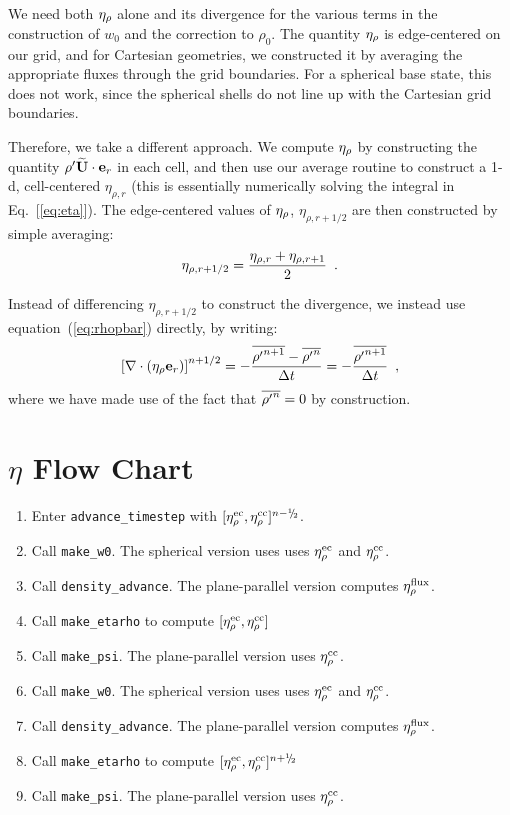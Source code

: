We need both $\eta_{\rho}$ alone and its divergence for the
various terms in the construction of $w_0$ and the correction to
$\rho_0$.  The quantity $\eta_{\rho}$ is edge-centered on our grid, and
for Cartesian geometries, we constructed it by averaging the
appropriate fluxes through the grid boundaries.  For a spherical base
state, this does not work, since the spherical shells do not line up
with the Cartesian grid boundaries.

Therefore, we take a different approach.  We compute $\eta_{\rho}$ by
constructing the quantity ${\rho^{\prime}} \widetilde{{\bf U}} \cdot \mathbf{e}_r$ in each cell, and then
use our average routine to construct a 1-d, cell-centered
$\eta_{\rho,r}$ (this is essentially numerically solving the integral
in Eq.~[\ref{eq:eta}]).  The edge-centered values of $\eta_{\rho}$,
$\eta_{\rho,r+1/2}$ are then constructed by simple
averaging: 
\begin{equation}
\eta_{\rho,r+1/2} = \frac{\eta_{\rho,r} + \eta_{\rho,r+1}}{2} \enskip .
\end{equation}

Instead of differencing $\eta_{\rho,r+1/2}$ to construct the 
divergence, we instead use equation~(\ref{eq:rhopbar}) directly, by writing:
\begin{equation}
\left [ \nabla \cdot (\eta_{\rho} \mathbf{e}_r ) \right ]^{n+1/2}
= - \frac{\overline{{\rho^{\prime}}^{n+1}} - \overline{{\rho^{\prime}}^n}}{\Delta t}
= - \frac{\overline{{\rho^{\prime}}^{n+1}}}{\Delta t} \enskip ,
\end{equation}
where we have made use of the fact that $\overline{{\rho^{\prime}}^n} = 0$ by construction.


\section{$\eta$ Flow Chart}
\begin{enumerate}
\item Enter {\tt advance\_timestep} with $[\etarhoec, \etarhocc]^{n-\myhalf}$.
\item Call {\tt make\_w0}.  The spherical version uses uses $\eta_{\rho}^{\rm ec}$ and $\eta_{\rho}^{\rm cc}$.
\item Call {\tt density\_advance}.  The plane-parallel version computes $\eta_{\rho}^{\rm flux}$.
\item Call {\tt make\_etarho} to compute $[\eta_{\rho}^{\rm ec}, \eta_{\rho}^{\rm cc}]$
\item Call {\tt make\_psi}.  The plane-parallel version uses $\eta_{\rho}^{\rm cc}$.
\item Call {\tt make\_w0}.  The spherical version uses uses $\eta_{\rho}^{\rm ec}$ and $\eta_{\rho}^{\rm cc}$.
\item Call {\tt density\_advance}.  The plane-parallel version computes $\eta_{\rho}^{\rm flux}$.
\item Call {\tt make\_etarho} to compute $[\etarhoec, \etarhocc]^{n+\myhalf}$
\item Call {\tt make\_psi}.  The plane-parallel version uses $\eta_{\rho}^{\rm cc}$.
\end{enumerate}


